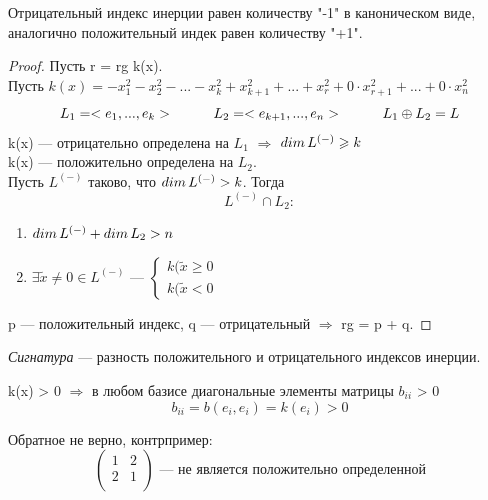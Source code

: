 \begin{lemma}
    Отрицательный индекс инерции равен количеству "-1" в каноническом виде, аналогично положительный индек равен количеству "+1".
\end{lemma}
\begin{proof}
    Пусть r = rg k(x).\\
    Пусть $k(x) = -x_1^2 - x_2^2 - ... - x_k^2 + x_{k + 1}^2 + ... + x_r^2 + 0\cdot x_{r + 1}^2 + ... + 0\cdot x_n^2$\\
    \[
    L_1 = <e_1, ..., e_k>\tab L_2 = <e_{k + 1}, ..., e_n>\tab L_1 \oplus L_2 = L
    \]
    k(x) --- отрицательно определена на $L_1$ $\Longrightarrow$ $dim\thinspace L^{(-)} \geq k$\\
    k(x) --- положительно определена на $L_2$.\\
    Пусть $L^{(-)}$ таково, что $dim\thinspace L^{(-)} > k$. Тогда
    \[
    L^{(-)} \cap L_2 :
    \]
    \begin{enumerate}
        \item $dim\thinspace L^{(-)} + dim\thinspace L_2 > n$
        \item $\exists \widetilde{x} \neq 0 \in L^{(-)}$ --- $\begin{cases}
            k(\widetilde{x} \geq 0\\
            k(\widetilde{x} < 0
        \end{cases}$
    \end{enumerate}
    p --- положительный индекс, q --- отрицательный $\Longrightarrow$ rg = p + q.
\end{proof}

\begin{definition}
    \textit{Сигнатура} --- разность положительного и отрицательного индексов инерции.
\end{definition}

\begin{lemma}
    k(x) > 0 $\Longrightarrow$ в любом базисе диагональные элементы матрицы $b_{ii}$ > 0
    \[
    b_{ii} = b(e_i, e_i) = k(e_i) > 0
    \]
\end{lemma}
\begin{note}
    Обратное не верно, контрпример:
    \[
    \begin{pmatrix}
        1 & 2\\
        2 & 1\\
    \end{pmatrix} \text{ --- не является положительно определенной}
    \]
\end{note}

